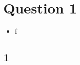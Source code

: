 
\section{Question 1}

\begin{itemize}
    \item  f
\end{itemize}

\begin{solve}

    \subsection{1}

    
\end{solve}